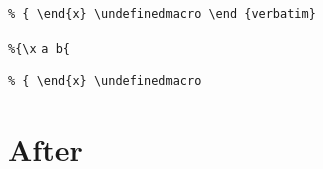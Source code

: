 \documentclass{article}
\begin{document}
\begin{verbatim}
% { \end{x} \undefinedmacro \end {verbatim}
\end{verbatim}
\gdef\AfterA{}
\verb|%{\x|\gdef\AfterB{}
\verb*+a b{+\gdef\AfterC{}
\begin{Verbatim}
% { \end{x} \undefinedmacro
\end{Verbatim}
\gdef\AfterD{}
\section{After}\label{after}
\gdef\SatexReachedEnd{}
\end{document}
